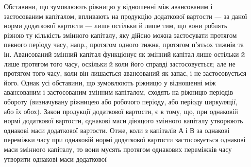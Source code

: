 Обставини, що зумовлюють ріжницю у відношенні між авансованим і
застосованим капіталом, впливають на продукцію додаткової вартости —
за даної норми додаткової вартости — лише остільки й лише тим, що
вони роблять різною ту кількість змінного капіталу, яку дійсно можна
застосувати протягом певного періоду часу, напр., протягом одного тижня,
протягом п’ятьох тижнів та ін. Авансований змінний капітал функціонує
як змінний капітал лише остільки й лише протягом того часу, оскільки й
коли його справді застосовується; але не протягом того часу, коли він
лишається авансований як запас, і не застосовується його. Однак усі
обставини, що зумовлюють ріжницю у відношенні між авансованим і застосованим
змінним капіталом, сходять на ріжницю періодів обороту
(визначувану ріжницею або робочого періоду, або періоду циркуляції,
або їх обох). Закон продукції додаткової вартости, є в тому, що, при однаковій
нормі додаткової вартости, однакові маси діющого змінного капіталу
утворюють однакові маси додаткової вартости. Отже, коли з капіталів
А і В за однакові переміжки часу при однаковій нормі додаткової
вартости застосовується однакові маси змінного капіталу, то вони мусять
протягом однакових переміжків часу утворити однакові маси додаткової
\parbreak{}  %
